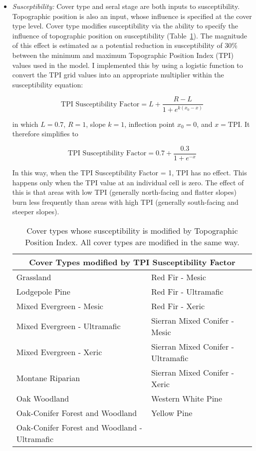 \begin{itemize}

\item \emph{Susceptibility:} Cover type and seral stage are both inputs to susceptibility. Topographic position is also an input, whose influence is specified at the cover type level. Cover type modifies susceptibility via the ability to specify the influence of topographic position on susceptibility (Table~\ref{covtpi}). The magnitude of this effect is estimated as a potential reduction in susceptibility of 30\% between the minimum and maximum Topographic Position Index (TPI) values used in the model. I implemented this by using a logistic function to convert the TPI grid values into an appropriate multiplier within the susceptibility equation:

$$\text{TPI Susceptibility Factor} = L + \frac{R-L}{1+e^{k(x_0-x)}}$$

in which $L= 0.7$, $R=1$, slope $k=1$, inflection point $x_0=0$, and $x=\text{TPI}$. %
It therefore simplifies to 

$$\text{TPI Susceptibility Factor} = 0.7 + \frac{0.3}{1+e^{-x}}$$

In this way, when the TPI Susceptibility Factor = 1, TPI has no effect. This happens only when the TPI value at an individual cell is zero. The effect of this is that areas with low TPI (generally north-facing and flatter slopes) burn less frequently than areas with high TPI (generally south-facing and steeper slopes).


\begin{table}[htbp]
\footnotesize
\centering
\caption{Cover types whose susceptibility is modified by Topographic Position Index. All cover types are modified in the same way.}
\label{covtpi}
\begin{tabular}{ll}
\hline
\multicolumn{2}{c}{\textbf{Cover Types modified by TPI Susceptibility Factor}} \\
\hline
Grassland     					& Red Fir - Mesic   			\\
Lodgepole Pine    				& Red Fir - Ultramafic			\\
Mixed Evergreen - Mesic				& Red Fir - Xeric    			\\
Mixed Evergreen - Ultramafic     		& Sierran Mixed Conifer - Mesic    	\\
Mixed Evergreen - Xeric 			& Sierran Mixed Conifer - Ultramafic 	\\
Montane Riparian				& Sierran Mixed Conifer - Xeric 	\\
Oak Woodland 					& Western White Pine			\\
Oak-Conifer Forest and Woodland 		& Yellow Pine 				\\
Oak-Conifer Forest and Woodland - Ultramafic 	&					\\
\hline
\end{tabular}


\end{table}
\end{itemize}
